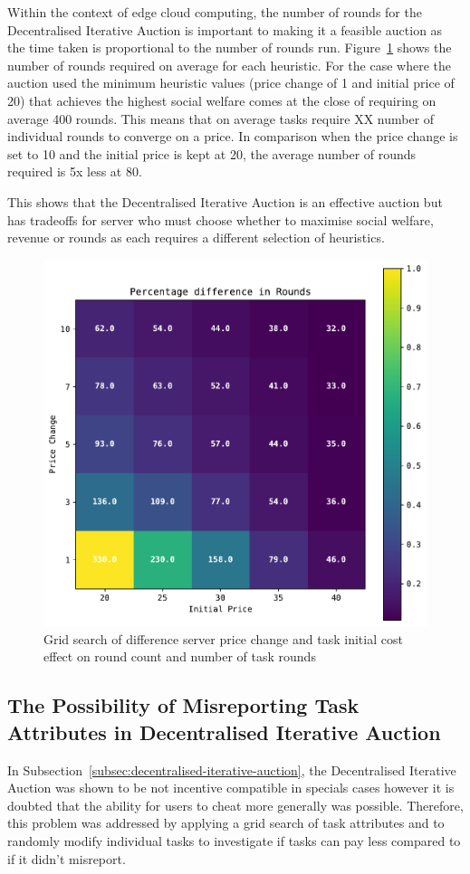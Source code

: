 Within the context of edge cloud computing, the number of rounds for the Decentralised Iterative Auction is important
to making it a feasible auction as the time taken is proportional to the number of rounds run.
Figure~\ref{fig:dia-rounds-grid-search} shows the number of rounds required on average for each heuristic. For the case where the
auction used the minimum heuristic values (price change of 1 and initial price of 20) that achieves the highest social
welfare comes at the close of requiring on average 400 rounds. This means that on average tasks require XX number %
of individual rounds to converge on a price. In comparison when the price change is set to 10 and the initial price is
kept at 20, the average number of rounds required is 5x less at 80.

This shows that the Decentralised Iterative Auction is an effective auction but has tradeoffs for server who must
choose whether to maximise social welfare, revenue or rounds as each requires a different selection of heuristics.

\begin{figure}[h]
    \centering
    \includegraphics[width=0.45\linewidth]{figs/dia_heuristics/rounds_grid.pdf}
    \caption{Grid search of difference server price change and task initial cost effect on round count and number of
             task rounds}
    \label{fig:dia-rounds-grid-search}
\end{figure}

\subsection{The Possibility of Misreporting Task Attributes in Decentralised Iterative Auction}
\label{subsec:possibility-of-misreporting-task-attributes-in-decentarlised-iterative-auction}
In Subsection~\ref{subsec:decentralised-iterative-auction}, the Decentralised Iterative Auction was shown to be not
incentive compatible in specials cases however it is doubted that the ability for users to cheat more generally was
possible. Therefore, this problem was addressed by applying a grid search of task attributes and to randomly modify
individual tasks to investigate if tasks can pay less compared to if it didn't misreport.

